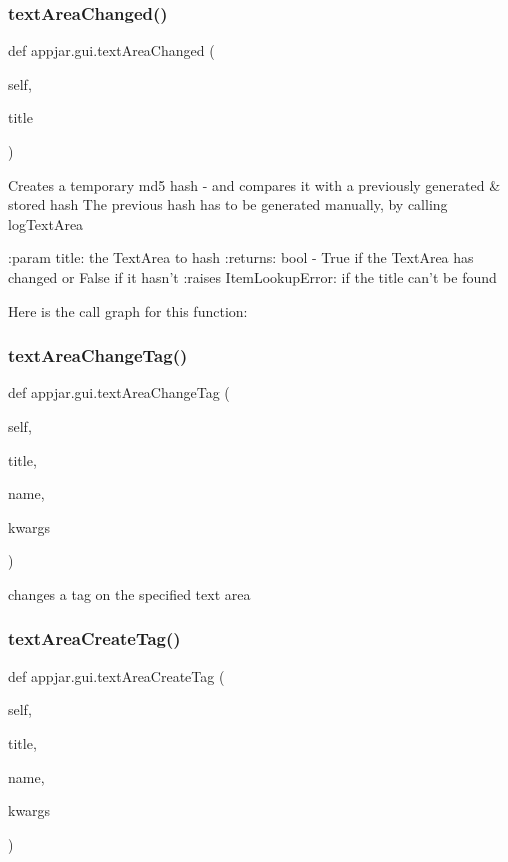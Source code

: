 \begin{DoxyVerb}
\subsubsection{\texorpdfstring{text\+Area\+Changed()}{textAreaChanged()}}
{\footnotesize\ttfamily def appjar.\+gui.\+text\+Area\+Changed (\begin{DoxyParamCaption}\item[{}]{self,  }\item[{}]{title }\end{DoxyParamCaption})}

\begin{DoxyVerb}Creates a temporary md5 hash - and compares it with a previously generated & stored hash
The previous hash has to be generated manually, by calling logTextArea

:param title: the TextArea to hash
:returns: bool - True if the TextArea has changed or False if it hasn't
:raises ItemLookupError: if the title can't be found
\end{DoxyVerb}
 Here is the call graph for this function\+:
\mbox{\label{classappjar_1_1gui_abb08ae3acbd35bf473c5940b709b9144}} 
\subsubsection{\texorpdfstring{text\+Area\+Change\+Tag()}{textAreaChangeTag()}}
{\footnotesize\ttfamily def appjar.\+gui.\+text\+Area\+Change\+Tag (\begin{DoxyParamCaption}\item[{}]{self,  }\item[{}]{title,  }\item[{}]{name,  }\item[{}]{kwargs }\end{DoxyParamCaption})}

\begin{DoxyVerb}changes a tag on the specified text area \end{DoxyVerb}
 \mbox{\label{classappjar_1_1gui_a862a8218a78d436eba57eaea79d9ccbc}} 
\subsubsection{\texorpdfstring{text\+Area\+Create\+Tag()}{textAreaCreateTag()}}
{\footnotesize\ttfamily def appjar.\+gui.\+text\+Area\+Create\+Tag (\begin{DoxyParamCaption}\item[{}]{self,  }\item[{}]{title,  }\item[{}]{name,  }\item[{}]{kwargs }\end{DoxyParamCaption})}


\end{DoxyVerb}
